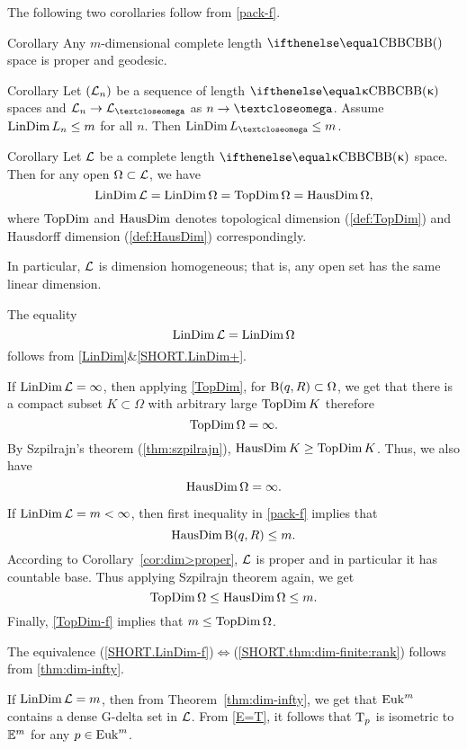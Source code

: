 The following two corollaries follow from \ref{pack-f}.

\begin{thm}{Corollary}\label{cor:dim>proper}
Any $m$-dimensional complete length $\Alex{}$ space is proper and geodesic.
\end{thm}


\begin{thm}{Corollary} Let $(\mathcal{L}_n)$ be a sequence of length $\Alex\kappa$ spaces and $\spc{L}_n\to \spc{L}_\o$ as $n\to\o$.
Assume $\LinDim L_n\le m$ for all $n$.
Then $\LinDim L_\o\le m$.
\end{thm}

\begin{thm}{Corollary}\label{dim=dim} 
Let $\mathcal{L}$ be a complete length $\Alex{\kappa}$ space. 
Then for any open $\Omega\subset \spc{L}$, we have
\[
\mathop{\rm LinDim}\nolimits \mathcal{L}=
\mathop{\rm LinDim}\nolimits\Omega =
\mathop{\rm TopDim}\nolimits\Omega=
\mathop{\rm HausDim}\nolimits\Omega,
\]
where $\mathop{\rm TopDim}\nolimits$ and $\mathop{\rm HausDim}\nolimits$ denotes  topological dimension (\ref{def:TopDim}) and Hausdorff dimension (\ref{def:HausDim}) correspondingly.

In particular, $\mathcal{L}$ is dimension homogeneous; that is, any open set has the same linear dimension.
\end{thm}

The equality
\[\mathop{\rm LinDim}\nolimits \mathcal{L}= \mathop{\rm LinDim}\nolimits\Omega\]
follows from \ref{LinDim}$\&$\ref{SHORT.LinDim+}.

If $\mathop{\rm LinDim}\nolimits \mathcal{L}=\infty$, then
applying  \ref{TopDim}, for $\oBall(q,R)\subset \Omega$, we get that there is a compact subset $K\subset \Omega$ with arbitrary large $\mathop{\rm TopDim}\nolimits K$ therefore
\[\mathop{\rm TopDim}\nolimits\Omega=\infty.\] 
By Szpilrajn's theorem (\ref{thm:szpilrajn}),
$\HausDim K\ge \TopDim K$.
Thus, we also have 
\[\mathop{\rm HausDim}\nolimits\Omega=\infty.\]

If $\mathop{\rm LinDim}\nolimits \mathcal{L}=m<\infty$, then first inequality in \ref{pack-f} 
implies that \[\HausDim \oBall(q,R)\le m.\] 
According to Corollary~\ref{cor:dim>proper}, 
$\mathcal{L}$ is proper and in particular it has countable base. 
Thus applying Szpilrajn theorem  again, we get
\[\TopDim\Omega\le \HausDim \Omega\le m.\]
Finally, \ref{TopDim-f} implies that $m\le\TopDim\Omega$.
\qeds


 The equivalence (\ref{SHORT.LinDim-f})$\Leftrightarrow$(\ref{SHORT.thm:dim-finite:rank}) follows from \ref{thm:dim-infty}.

If $\mathop{\rm LinDim}\nolimits\mathcal{L}=m$, then from Theorem~\ref{thm:dim-infty}, 
we get that $\mathop{\rm Euk}\nolimits^m$ contains a dense G-delta set in $\mathcal{L}$.
From \ref{E=T}, it follows that $\text{\rm T}_p$ is isometric to $\mathbb{E}^m$ for any $p\in \Euk^m$.

